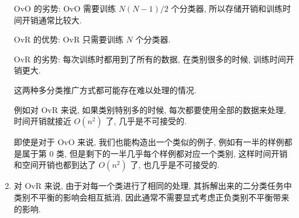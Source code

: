 \documentclass[answers]{exam}  %
\begin{document}
\begin{questions}
\begin{solution}
\begin{enumerate}
            OvO 的劣势: OvO 需要训练 $N(N-1)/2$ 个分类器, 所以存储开销和训练时间开销通常比较大.

            OvR 的优势: OvR 只需要训练 $N$ 个分类器.

            OvR 的劣势: 每次训练时都用到了所有的数据, 在类别很多的时候, 训练时间开销更大.

            这两种多分类推广方式都可能存在难以处理的情况.

            例如对 OvR 来说, 如果类别特别多的时候, 每次都要使用全部的数据来处理, 时间开销就接近 $O(n^{2})$ 了, 几乎是不可接受的.

            即使是对于 OvO 来说, 我们也能构造出一个类似的例子, 例如有一半的样例都是属于第 0 类, 但是剩下的一半几乎每个样例都对应一个类别, 这样时间开销和空间开销也都到达了 $O(n^{2})$ 了, 也几乎是不可接受的.

      \item

            对 OvR 来说, 由于对每一个类进行了相同的处理, 其拆解出来的二分类任务中类别不平衡的影响会相互抵消, 因此通常不需要显式考虑正负类别不平衡带来的影响.
    \end{enumerate}
  \end{solution}

\end{questions}
\end{document}
